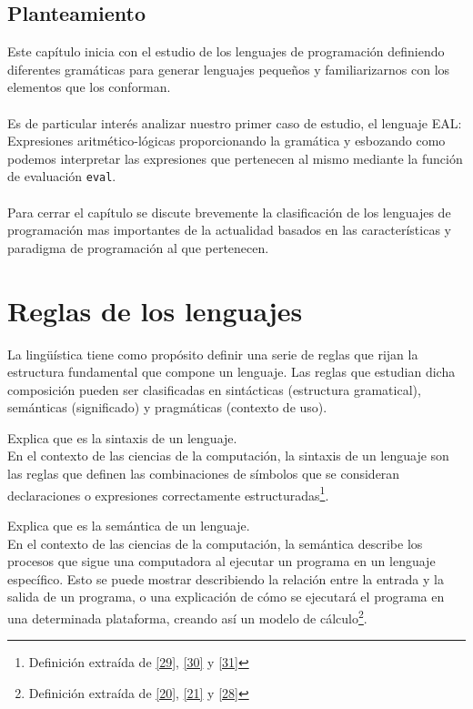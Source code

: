 \subsection*{Planteamiento}
    Este capítulo inicia con el estudio de los lenguajes de programación definiendo diferentes gramáticas para generar lenguajes pequeños y familiarizarnos con los elementos que los conforman.\\\\
    Es de particular interés analizar nuestro primer caso de estudio, el lenguaje \textsf{EAL}: Expresiones aritmético-lógicas proporcionando la gramática y esbozando como podemos interpretar las expresiones que pertenecen al mismo mediante la función de evaluación \texttt{eval}.\\\\
    Para cerrar el capítulo se discute brevemente la clasificación de los lenguajes de programación mas importantes de la actualidad basados en las características y paradigma de programación al que pertenecen. 

\section{Reglas de los lenguajes}

    La lingüística tiene como propósito definir una serie de reglas que rijan la estructura fundamental que compone un lenguaje.
Las reglas que estudian dicha composición pueden ser clasificadas en sintácticas (estructura gramatical), semánticas (significado) y pragmáticas (contexto de uso).\\

    \begin{exercise}
        Explica que es la sintaxis  de un lenguaje.     \\
        En el contexto de las ciencias de la computación, la sintaxis de un lenguaje son las reglas que definen las combinaciones de símbolos que se consideran declaraciones o expresiones correctamente estructuradas\footnote{Definición extraída de  \hyperlink{29}{[29]}, \hyperlink{30}{[30]} y \hyperlink{31}{[31]}}.
        
    \end{exercise}

\bigskip

    \begin{exercise}
       Explica que es la semántica de un lenguaje.    \\
        En el contexto de las ciencias de la computación, la semántica describe los procesos que sigue una computadora al ejecutar un programa en un lenguaje específico. Esto se puede mostrar describiendo la relación entre la entrada y la salida de un programa, o una explicación de cómo se ejecutará el programa en una determinada plataforma, creando así un modelo de cálculo\footnote{Definición extraída de \hyperlink{20}{[20]},  \hyperlink{21}{[21]} y \hyperlink{28}{[28]}}.
    \end{exercise} 


